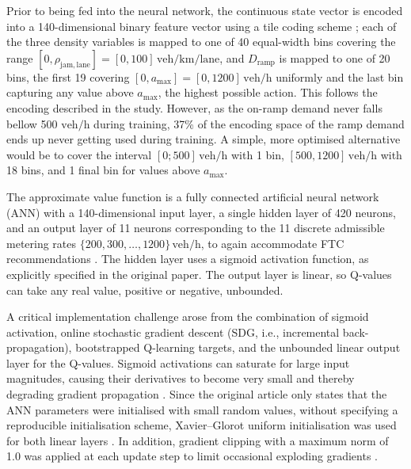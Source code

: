 Prior to being fed into the neural network, the continuous state vector is encoded into a 140-dimensional binary feature vector using a tile coding scheme \citep{EPSILON_GREEDY}; each of the three density variables is mapped to one of 40 equal-width bins covering the range $[0,\rho_{\mathrm{jam,lane}}] = [0,100]\,\mathrm{veh/km/lane}$, and $D_{\mathrm{ramp}}$ is mapped to one of 20 bins, the first 19 covering $[0,a_{\max}] = [0,1200]\,\mathrm{veh/h}$ uniformly and the last bin capturing any value above $a_{\max}$, the highest possible action. This follows the encoding described in the study. However, as the on-ramp demand never falls bellow 500 $\mathrm{veh/h}$ during training, 37\%  of the encoding space of the ramp demand ends up never getting used during training. A simple, more optimised alternative would be to cover the interval $[0;500]\,\mathrm{veh/h}$ with 1 bin, $ [500,1200]\,\mathrm{veh/h}$ with 18 bins, and 1 final bin for values above $a_{\max}$.

The approximate value function is a fully connected artificial neural network (ANN) with a 140-dimensional input layer, a single hidden layer of 420 neurons, and an output layer of 11 neurons corresponding to the 11 discrete admissible metering rates $\{200,300,\ldots,1200\}\,\mathrm{veh/h}$, to again accommodate FTC recommendations \citep{Full_Traffic_Cycle}. The hidden layer uses a sigmoid activation function, as explicitly specified in the original paper. The output layer is linear, so Q-values can take any real value, positive or negative, unbounded.

A critical implementation challenge arose from the combination of sigmoid
activation, online stochastic gradient descent (SDG, i.e., incremental back-propagation), bootstrapped Q-learning targets,
and the unbounded linear output layer for the Q-values. Sigmoid activations can
saturate for large input magnitudes, causing their derivatives to become very
small and thereby degrading gradient propagation
\citep{XAVIER_INITIALIZATION}. Since the original article
only states that the ANN parameters were initialised with small random values,
without specifying a reproducible initialisation scheme, Xavier--Glorot uniform
initialisation was used for both linear layers \citep{XAVIER_INITIALIZATION}.
In addition, gradient clipping with a maximum norm of 1.0 was applied at each
update step to limit occasional exploding gradients
\citep{GRADIENT_CLIPPING}.


